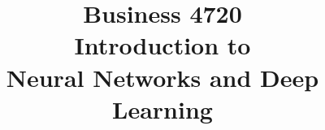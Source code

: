 \documentclass{article}
\title{Business 4720\\ \vspace{\baselineskip}
Introduction to \\Neural Networks and Deep Learning}
\begin{document}
\maketitle

\vfill

\clearpage


\end{document}

